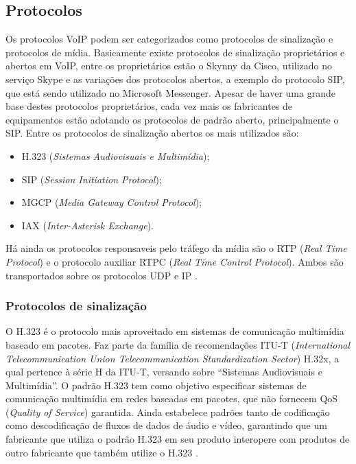 \subsection{Protocolos}

Os protocolos VoIP podem ser categorizados como protocolos de sinalização e  protocolos de mídia. Basicamente existe protocolos de sinalização proprietários e abertos em VoIP, entre os proprietários estão o Skynny da Cisco, utilizado no serviço Skype e as variações dos protocolos abertos, a exemplo do protocolo SIP, que está sendo utilizado no Microsoft Messenger. Apesar de haver uma grande base destes protocolos proprietários, cada vez mais os fabricantes de equipamentos estão adotando os protocolos de padrão aberto, principalmente o SIP. Entre os protocolos de sinalização abertos os mais utilizados são: \cite{davidson2008}
\begin{itemize}
  \item H.323 (\textit{Sistemas Audiovisuais e Multimídia});
  \item SIP (\textit{Session Initiation Protocol});
  \item MGCP (\textit{Media Gateway Control Protocol});
  \item IAX (\textit{Inter-Asterisk Exchange}).
\end{itemize}

Há ainda os protocolos responsaveis pelo tráfego da mídia são o RTP (\textit{Real Time Protocol}) e o protocolo auxiliar RTPC (\textit{Real Time Control Protocol}). Ambos são transportados sobre os protocolos UDP e IP \cite{davidson2008}.

\subsubsection{Protocolos de sinalização}

O H.323 é o protocolo mais aproveitado em sistemas de comunicação multimídia baseado em pacotes. Faz parte da família de recomendações ITU-T (\textit{International Telecommunication Union Telecommunication Standardization Sector}) H.32x, a qual pertence à série H da ITU-T, versando sobre “Sistemas Audiovisuais e Multimídia”. O padrão H.323 tem como objetivo especificar sistemas de comunicação multimídia em redes baseadas em pacotes, que não fornecem QoS (\textit{Quality of Service}) garantida. Ainda estabelece padrões tanto de codificação como descodificação de fluxos de dados de áudio e vídeo, garantindo que um fabricante que utiliza o padrão H.323 em seu produto interopere com produtos de outro fabricante que também utilize o H.323 \cite{thiagowinkler2007}.

